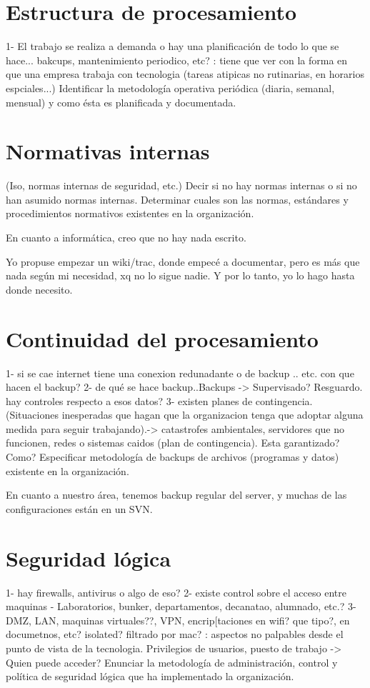 \documentclass[10pt,a4paper,final]{article}
\begin{document}
\section{Estructura de procesamiento}
1- El trabajo se realiza a demanda o hay una planificación de todo lo que se hace... bakcups, mantenimiento periodico, etc?
: tiene que ver con la forma en que una empresa trabaja con tecnologia (tareas atipicas no rutinarias, en horarios espciales...)
Identificar la metodología operativa periódica (diaria, semanal, mensual) y como ésta es planificada y documentada.

\section{Normativas internas}
 (Iso, normas internas de seguridad, etc.) Decir si no hay normas internas o si no han asumido normas internas.
 Determinar cuales son las normas, estándares y procedimientos normativos existentes en la organización.

En cuanto a informática, creo que no hay nada escrito.

Yo propuse empezar un wiki/trac, donde empecé a documentar, pero es más que nada según mi necesidad, xq no lo sigue nadie. Y por lo tanto, yo lo hago hasta donde necesito. 

\section{Continuidad del procesamiento}
1- si se cae internet tiene una conexion redunadante o de backup .. etc. con que hacen el backup?
2- de qué se hace backup..Backups -> Supervisado? Resguardo. hay controles respecto a esos datos?
3- existen planes de contingencia.
 (Situaciones inesperadas que hagan que la organizacion tenga que adoptar alguna medida para seguir trabajando).-> catastrofes ambientales, servidores que no funcionen, redes o sistemas caidos (plan de contingencia). Esta garantizado? Como?
 Especificar metodología de backups de archivos (programas y datos) existente en la organización.

En cuanto a nuestro área, tenemos backup regular del server, y muchas de las configuraciones están en un SVN. 
\section{Seguridad lógica}
1- hay firewalls, antivirus o algo de eso?
2- existe control sobre el acceso entre maquinas - Laboratorios, bunker, departamentos, decanatao, alumnado, etc.?
3- DMZ, LAN, maquinas virtuales??, VPN, encrip[taciones en wifi? que tipo?, en documetnos, etc? isolated? filtrado por mac?
: aspectos no palpables desde el punto de vista de la tecnologia. Privilegios de usuarios, puesto de trabajo -> Quien puede acceder? 
Enunciar la metodología de administración, control y política de seguridad lógica que ha implementado la organización.
\end{document}
